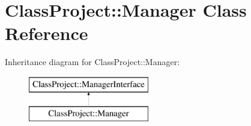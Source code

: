 \section{Class\+Project\+:\+:Manager Class Reference}
\label{classClassProject_1_1Manager}
Inheritance diagram for Class\+Project\+:\+:Manager\+:\begin{figure}[H]
\begin{center}
\leavevmode
\includegraphics[height=2.000000cm]{classClassProject_1_1Manager}
\end{center}
\end{figure}
